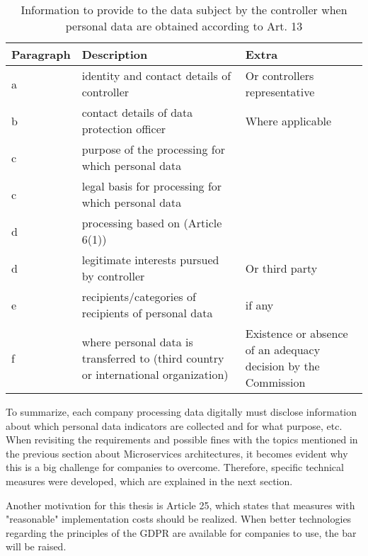 \begin{table}[h]
    \centering
    \begin{tabularx}{\linewidth}{ lXX }
        \textbf{Paragraph} & \textbf{Description} & \textbf{Extra} \\
        \hline
        a & identity and contact details of controller & Or controllers representative \\
        \hline
        b & contact details of data protection officer & Where applicable  \\
        \hline
        c & purpose of the processing for which personal data & \\
        \hline
        c & legal basis for processing for which personal data & \\
        \hline
        d & processing based on (Article 6(1)) & \\
        \hline
        d & legitimate interests pursued by controller & Or third party \\
        \hline
        e & recipients/categories of recipients of personal data & if any \\
        \hline
        f & where personal data is transferred to (third country or international organization) & Existence or absence of an adequacy decision by the Commission \\
        \hline
    \end{tabularx}
    \caption{Information to provide to the data subject by the controller when personal data are obtained according to Art. 13 \cite{noauthor_review_nodate}}
    \label{tab:gdpr_art_13_1}
\end{table}
To summarize, each company processing data digitally must disclose information about which personal data indicators are collected and for what purpose, etc. When revisiting the requirements and possible fines with the topics mentioned in the previous section about Microservices architectures, it becomes evident why this is a big challenge for companies to overcome. Therefore, specific technical measures were developed, which are explained in the next section.

Another motivation for this thesis is Article 25, which states that measures with "reasonable" implementation costs should be realized. When better technologies regarding the principles of the GDPR are available for companies to use, the bar will be raised.

